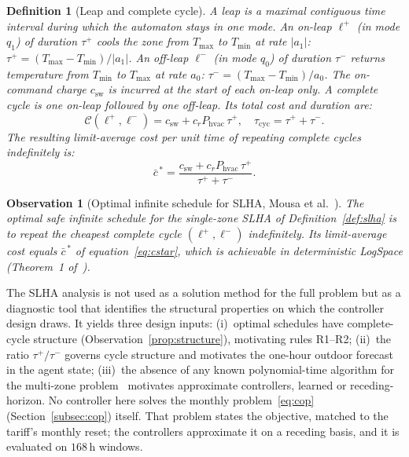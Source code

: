 \documentclass[3p,twocolumn,number]{elsarticle}
\newtheorem{definition}{Definition} \newtheorem{proposition}{Proposition} \newtheorem{remark}{Remark} \newtheorem{observation}{Observation} \newtheorem{corollary}{Corollary}
\newcommand{\Tmin}{T_{\min}}
\newcommand{\Tmax}{T_{\max}}
\newcommand{\csw}{c_{\mathrm{sw}}}
\newcommand{\Phvac}{P_{\mathrm{hvac}}}
\newcommand{\taup}{\tau^{+}}
\newcommand{\taum}{\tau^{-}}
\begin{document}
 
\begin{definition}[Leap and complete cycle]
\label{def:leap}
A \emph{leap} is a maximal contiguous time interval during which the automaton stays in one mode. An \emph{on-leap} $\ell^+$ (in mode $q_1$) of duration $\taup$ cools the zone from $\Tmax$ to $\Tmin$ at rate $|a_1|$: $\taup=({\Tmax-\Tmin})/{|a_1|}$. An \emph{off-leap} $\ell^-$ (in mode $q_0$) of duration $\taum$ returns temperature from $\Tmin$ to $\Tmax$ at rate $a_0$: $\taum=({\Tmax-\Tmin})/{a_0}$. The on-command charge $\csw$ is incurred at the start of each on-leap only. A \emph{complete cycle} is one on-leap followed by one off-leap. Its total cost and duration are:
\begin{equation}
  \mathcal{C}(\ell^+,\ell^-)
  = \csw + c_r\Phvac\,\taup,
  \quad
  \tau_{\mathrm{cyc}} = \taup+\taum.
  \label{eq:cycle_cost}
\end{equation}
The resulting \emph{limit-average cost per unit time} of repeating complete cycles indefinitely is:
\begin{equation}
  \bar{c}^{\,*}
  = \frac{\csw+c_r\Phvac\,\taup}{\,\taup+\taum\,}.
  \label{eq:cstar}
\end{equation}
\end{definition}
 

 
\begin{observation}[Optimal infinite schedule for SLHA, Mousa et al.~\cite{Mousa2016}]
\label{obs:optimal}
The optimal safe infinite schedule for the single-zone SLHA of Definition~\ref{def:slha} is to repeat the cheapest complete cycle $(\ell^+,\ell^-)$ indefinitely. Its limit-average cost equals $\bar{c}^{\,*}$ of equation~\eqref{eq:cstar}, which is achievable in deterministic LogSpace (Theorem~1 of~\cite{Mousa2016}).
\end{observation}
 

The SLHA analysis is not used as a solution method for the full problem but as a diagnostic tool that identifies the structural properties on which the controller design draws. It yields three design inputs: (i)~optimal schedules have complete-cycle structure (Observation~\ref{prop:structure}), motivating rules R1--R2; (ii)~the ratio $\taup/\taum$ governs cycle structure and motivates the one-hour outdoor forecast in the agent state; (iii)~the absence of any known polynomial-time algorithm for the multi-zone problem~\cite{Mousa2017} motivates approximate controllers, learned or receding-horizon. No controller here solves the monthly problem~\eqref{eq:cop} (Section~\ref{subsec:cop}) itself. That problem states the objective, matched to the tariff's monthly reset; the controllers approximate it on a receding basis, and it is evaluated on $168\,$h windows.
\end{document}
